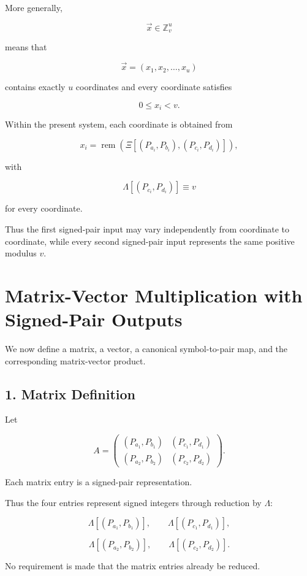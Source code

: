 \documentclass[12pt]{article}
\begin{document}
More generally,

\[
\boxed{
\vec{x}\in\mathbb Z_v^u
}
\]

means that

\[
\vec{x}
=
(x_1,x_2,\ldots,x_u)
\]

contains exactly \(u\) coordinates and every coordinate satisfies

\[
\boxed{
0\leq x_i<v.
}
\]

Within the present system, each coordinate is obtained from

\[
\boxed{
x_i
=
\operatorname{rem}
\left(
\Xi[
(P_{a_i},P_{b_i}),
(P_{c_i},P_{d_i})
]
\right),
}
\]

with

\[
\boxed{
\Lambda[(P_{c_i},P_{d_i})]\equiv v
}
\]

for every coordinate.

Thus the first signed-pair input may vary independently from coordinate to coordinate, while every second signed-pair input represents the same positive modulus \(v\).

\section*{Matrix-Vector Multiplication with Signed-Pair Outputs}

We now define a matrix, a vector, a canonical symbol-to-pair map, and the corresponding matrix-vector product.

\subsection*{1. Matrix Definition}

Let

\[
A
=
\begin{pmatrix}
(P_{a_1},P_{b_1}) & (P_{c_1},P_{d_1})\\
(P_{a_2},P_{b_2}) & (P_{c_2},P_{d_2})
\end{pmatrix}.
\]

Each matrix entry is a signed-pair representation.

Thus the four entries represent signed integers through reduction by \(\Lambda\):

\[
\Lambda[(P_{a_1},P_{b_1})],
\qquad
\Lambda[(P_{c_1},P_{d_1})],
\]

\[
\Lambda[(P_{a_2},P_{b_2})],
\qquad
\Lambda[(P_{c_2},P_{d_2})].
\]

No requirement is made that the matrix entries already be reduced.
\end{document}
